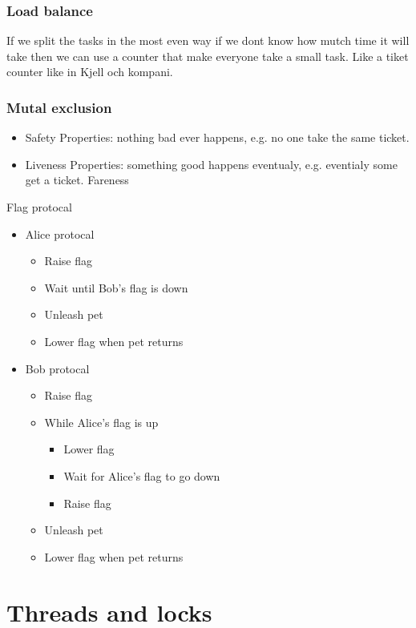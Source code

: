 \subsubsection{Load balance}
If we split the tasks in the most even way if we dont know how mutch time
it will take then we can use a counter that make everyone take a small task.
Like a tiket counter like in Kjell och kompani.

\subsubsection{Mutal exclusion}
\begin{itemize}
 \item Safety Properties: nothing bad ever happens, e.g. no one take the same ticket.
 \item Liveness Properties: something good happens eventualy, e.g. eventialy some get a ticket.
Fareness
\end{itemize}

Flag protocal
\begin{itemize}
\item Alice protocal
  \begin{itemize}
    \item Raise flag
    \item Wait until Bob’s flag is down
    \item Unleash pet
    \item Lower flag when pet returns
  \end{itemize}
\item Bob protocal
  \begin{itemize}
    \item Raise flag
    \item While Alice’s flag is up
      \begin{itemize}
        \item Lower flag
        \item Wait for Alice’s flag to go down
        \item Raise flag
      \end{itemize}
    \item Unleash pet
    \item Lower flag when pet returns
  \end{itemize}
\end{itemize}


\section{Threads and locks}
